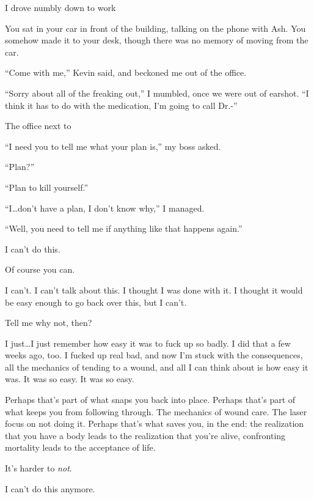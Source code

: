 I drove numbly down to work

\begin{ally}
You sat in your car in front of the building, talking on the phone with Ash. You somehow made it to your desk, though there was no memory of moving from the car.
\end{ally}
``Come with me,'' Kevin said, and beckoned me out of the office.

``Sorry about all of the freaking out,'' I mumbled, once we were out of earshot. ``I think it has to do with the medication, I'm going to call Dr.-''

\begin{ally}
The office next to
\end{ally}
``I need you to tell me what your plan is,'' my boss asked.

``Plan?''

``Plan to kill yourself.''

``I\ldots{}don't have a plan, I don't know why,'' I managed.

``Well, you need to tell me if anything like that happens again.''
\newpage

I can't do this.

\begin{ally}
Of course you can.
\end{ally}
I can't. I can't talk about this. I thought I was done with it. I thought it would be easy enough to go back over this, but I can't.

\begin{ally}
Tell me why not, then?
\end{ally}
I just\ldots{}I just remember how easy it was to fuck up so badly. I did that a few weeks ago, too. I fucked up real bad, and now I'm stuck with the consequences, all the mechanics of tending to a wound, and all I can think about is how easy it was. It was so easy. It was so easy.

\begin{ally}
Perhaps that's part of what snaps you back into place. Perhaps that's part of what keeps you from following through. The mechanics of wound care. The laser focus on not doing it. Perhaps that's what saves you, in the end: the realization that you have a body leads to the realization that you're alive, confronting mortality leads to the acceptance of life.
\end{ally}
It's harder to \emph{not}.
\newpage

I can't do this anymore.

